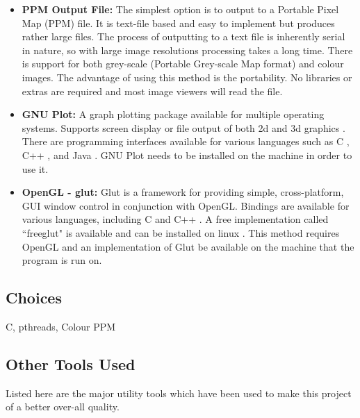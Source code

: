 \begin{itemize}
\item \textbf{PPM Output File:} The simplest option is to output to a Portable Pixel Map (PPM) file. It is 
              text-file based and easy to implement but produces rather large files. 
              The process of outputting to a text file is inherently serial in nature,
              so with large image resolutions processing takes a long time.
              There is support for both grey-scale (Portable Grey-scale Map format) and colour images. 
              The advantage of using this method is the portability. No libraries or extras are required
              and most image viewers will read the file. \cite{ppmspec}
              
\item \textbf{GNU Plot:} A graph plotting package available for multiple operating systems. 
              Supports screen display or file output of both 2d and 3d graphics \cite{gnuplot}.
              There are programming interfaces available for various languages such as C \cite{gnuplotcint}, C++ \cite{gnuplotcppint}, 
              and Java \cite{gnuplotjint}.
              GNU Plot needs to be installed on the machine in order to use it.
              
\item \textbf{OpenGL - glut:} Glut is a framework for providing simple, cross-platform, GUI window control in conjunction
              with OpenGL. Bindings are available for various languages, including C and C++ \cite{openglglut}.
              A free implementation called ``freeglut" is available and can be installed on linux \cite{freeglut}.
              This method requires OpenGL and an implementation of Glut be available on the machine that the program 
              is run on.
              
\end{itemize}

\subsection*{Choices}

C, pthreads, Colour PPM %

\subsection*{Other Tools Used}

Listed here are the major utility tools which have been used to make this project of a better over-all 
quality. 

